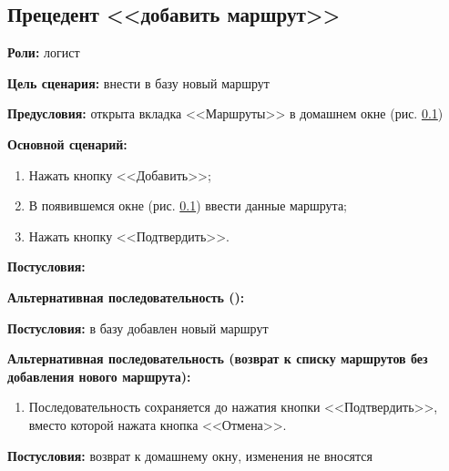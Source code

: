 \subsection{Прецедент <<добавить маршрут>>}
\textbf{Роли:} логист \par
\textbf{Цель сценария:} внести в базу новый маршрут \par
\textbf{Предусловия:} открыта вкладка <<Маршруты>> 
    в домашнем окне (рис. \ref{}) \par
\textbf{Основной сценарий:} 
\begin{enumerate}
    \item Нажать кнопку <<Добавить>>;
    \item В появившемся окне (рис. \ref{}) ввести данные маршрута;
    \item Нажать кнопку <<Подтвердить>>.
\end{enumerate} \par
\textbf{Постусловия:}  \par
\textbf{Альтернативная последовательность ():} \par
\begin{enumerate}
\end{enumerate} \par
\textbf{Постусловия:} в базу добавлен новый маршрут \par
\textbf{Альтернативная последовательность 
    (возврат к списку маршрутов без добавления нового маршрута):} \par
\begin{enumerate}
    \item Последовательность сохраняется до нажатия кнопки <<Подтвердить>>, 
        вместо которой нажата кнопка <<Отмена>>.
\end{enumerate} \par
\textbf{Постусловия:} возврат к домашнему окну, изменения не вносятся \par

